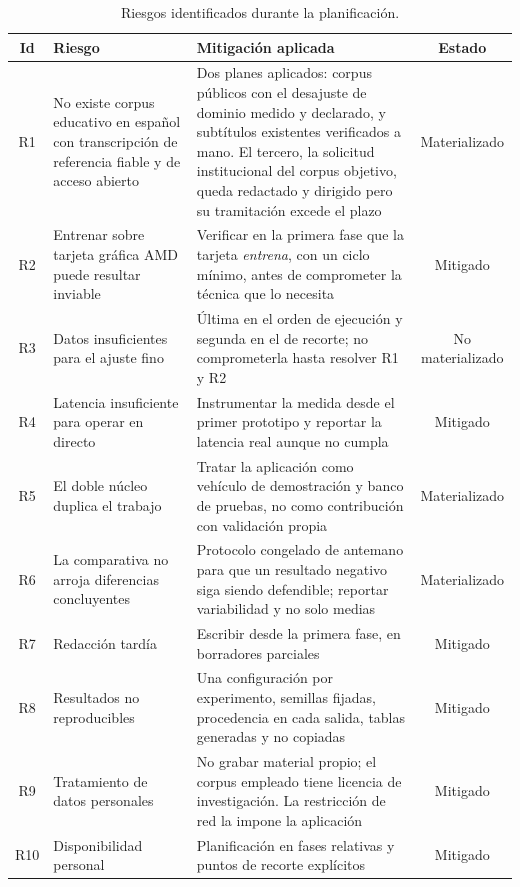 \begin{table}[h]
\centering
\footnotesize
\setlength{\tabcolsep}{4pt}
\begin{tabular}{|c|p{5.1cm}|p{5.6cm}|c|}
\hline
\textbf{Id} & \textbf{Riesgo} & \textbf{Mitigación aplicada} & \textbf{Estado} \\
\hline
R1 & No existe corpus educativo en español con transcripción de referencia fiable y de
     acceso abierto & Dos planes aplicados: corpus públicos con el desajuste de dominio
     medido y declarado, y subtítulos existentes verificados a mano. El tercero, la
     solicitud institucional del corpus objetivo, queda redactado y dirigido pero su
     tramitación excede el plazo & Materializado \\
\hline
R2 & Entrenar sobre tarjeta gráfica AMD puede resultar inviable & Verificar en la primera
     fase que la tarjeta \emph{entrena}, con un ciclo mínimo, antes de comprometer la
     técnica que lo necesita & Mitigado \\
\hline
R3 & Datos insuficientes para el ajuste fino & Última en el orden de ejecución y segunda en
     el de recorte; no comprometerla hasta resolver R1 y R2 & No materializado \\
\hline
R4 & Latencia insuficiente para operar en directo & Instrumentar la medida desde el primer
     prototipo y reportar la latencia real aunque no cumpla & Mitigado \\
\hline
R5 & El doble núcleo duplica el trabajo & Tratar la aplicación como vehículo de
     demostración y banco de pruebas, no como contribución con validación propia &
     Materializado \\
\hline
R6 & La comparativa no arroja diferencias concluyentes & Protocolo congelado de antemano
     para que un resultado negativo siga siendo defendible; reportar variabilidad y no solo
     medias & Materializado \\
\hline
R7 & Redacción tardía & Escribir desde la primera fase, en borradores parciales & Mitigado \\
\hline
R8 & Resultados no reproducibles & Una configuración por experimento, semillas fijadas,
     procedencia en cada salida, tablas generadas y no copiadas & Mitigado \\
\hline
R9 & Tratamiento de datos personales & No grabar material propio; el corpus empleado tiene
     licencia de investigación. La restricción de red la impone la aplicación & Mitigado \\
\hline
R10 & Disponibilidad personal & Planificación en fases relativas y puntos de recorte
      explícitos & Mitigado \\
\hline
\end{tabular}
\caption{Riesgos identificados durante la planificación.}
\label{tab:riesgos-previstos}
\end{table}

